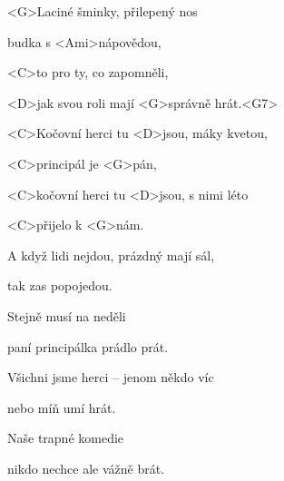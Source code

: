 
\zs
<G>Laciné šminky, přilepený nos

budka s <Ami>nápovědou,

<C>to pro ty, co zapomněli,

<D>jak svou roli mají <G>správně hrát.<G7> 
\ks
\zr

<C>Kočovní herci tu <D>jsou, máky kvetou,

<C>principál je <G>pán,

<C>kočovní herci tu <D>jsou, s nimi léto

<C>přijelo k <G>nám.
\kr
\zs

A když lidi nejdou, prázdný mají sál,

tak zas popojedou.

Stejně musí na neděli

paní principálka prádlo prát.

\ks
\zr \kr
\zs


Všichni jsme herci -- jenom někdo víc

nebo míň umí hrát.

Naše trapné komedie

nikdo nechce ale vážně brát.
\ks

\zr
\kr

\kp

